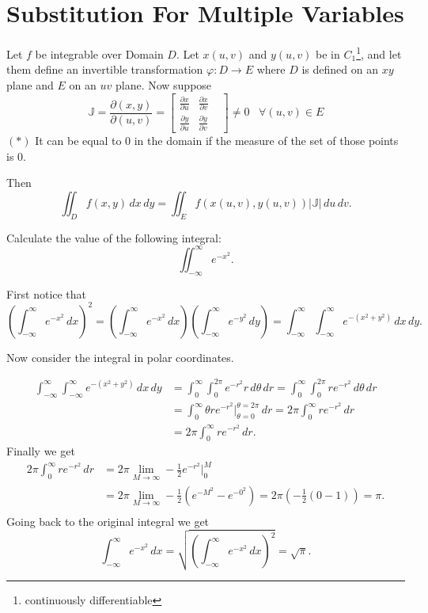\documentclass[11pt,a4paper]{article}
\begin{document}
	\newpage
	\section{Substitution For Multiple Variables}
	Let $f$ be integrable over Domain $D$.
  Let $x(u,v)$ and $y(u,v)$ be in $C_1$\footnote{continuously differentiable},
  and let them define an invertible transformation $\varphi:D\to E$ 
  where $D$ is defined on an $xy$ plane and $E$ on an $uv$ plane.
  Now suppose
	\[
		\mathbb{J} =\frac{\partial(x,y)}{\partial(u,v)} = 
	  \begin{bmatrix}
      \frac{\partial x}{\partial u} & 
      \frac{\partial x}{\partial v} & \\[1ex]
      \frac{\partial y}{\partial u} & 
      \frac{\partial y}{\partial v}
	  \end{bmatrix} \neq 0 \;\;\;\forall (u,v)\in E
	\]
	$(*)$ It can be equal to $0$ in the domain if the measure of the set of
  those points is $0$.

	Then
	\[
		\iint_D f(x,y) \, dx \, dy =
    \iint_E f(x(u,v),y(u,v)) |\mathbb{J}| \, du \, dv.
	\]


	\newpage
  \begin{exercise}
    Calculate the value of the following integral:
    \[
      \iint_{-\infty}^{\infty} e^{-x^2}.
    \]
  \end{exercise}
  \begin{solution}
    First notice that
    \[
      \left(\int_{-\infty}^\infty{e^{-x^2}}\, dx\right)^2 = 
      \left(\int_{-\infty}^\infty{e^{-x^2}}\, dx\right) 
      \left(\int_{-\infty}^\infty{e^{-y^2}}\, dy\right) = 
      \int_{-\infty}^\infty\int_{-\infty}^\infty{e^{-(x^2+y^2)}}\, dx\, dy.
    \]

    Now consider the integral in polar coordinates.

    \begin{align*}
      \int_{-\infty}^{\infty}
      \int_{-\infty}^{\infty} e^{-(x^2+y^2)} \, dx\, dy &=
      \int_{0}^{\infty} \int_{0}^{2\pi} e^{-r^2}r\, d\theta\, dr = 
      \int_{0}^{\infty} \int_{0}^{2\pi} r e^{-r^2}\, d\theta\, dr \\ &=
      \int_{0}^{\infty} \theta r e^{-r^2} 
      \biggr\vert^{\theta = 2\pi}_{\theta = 0}\, dr =
      2 \pi \int_{0}^{\infty} r e^{-r^2}\, dr \\ &=
      2 \pi \int_{0}^{\infty} r e^{-r^2}\, dr.
    \end{align*}
    Finally we get 
    \begin{align*}
      2 \pi \int_{0}^{\infty} r e^{-r^2}\, dr &= 
      2 \pi \lim_{M\to\infty} -\frac 12{e^{-r^2}}\biggr\vert^M_0 \\ &=
      2 \pi \lim_{M\to\infty} -\frac 12   (e^{-M^2} - e^{-0^2}) =
      2 \pi (- \frac 12(0-1)) = \pi. \\
    \end{align*}
    Going back to the original integral we get
    \[
      \int_{-\infty}^\infty{e^{-x^2}}\, dx =
      \sqrt{\left(\int_{-\infty}^\infty{e^{-x^2}}\, dx\right)^2} =
      \sqrt{\pi}.
    \]
  \end{solution}
  
\end{document}
